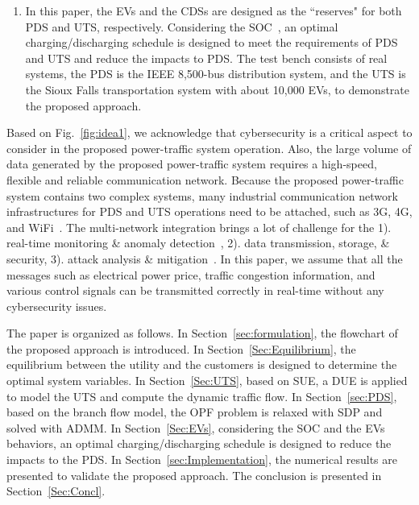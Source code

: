 \documentclass[final]{IEEEtran}
\begin{document}
\begin{enumerate}
	\item In this paper, the EVs and the CDSs are designed as the ``reserves" for both PDS and UTS, respectively. Considering the SOC~\cite{he2013n1ew,pattipati2011sy11stem}, an optimal charging/discharging schedule is designed to meet the requirements of PDS and UTS and reduce the impacts to PDS. The test bench consists of real systems, the PDS is the IEEE 8,500-bus distribution system, and the UTS is the Sioux Falls transportation system with about 10,000 EVs, to demonstrate the proposed approach.
\end{enumerate}

 Based on Fig.~\ref{fig:idea1}, we acknowledge that cybersecurity is a critical aspect to consider in the proposed power-traffic system operation. Also, the large volume of data generated by the proposed power-traffic system requires a high-speed, flexible and reliable communication network. Because the proposed power-traffic system contains two complex systems, many industrial communication network infrastructures for PDS and UTS operations need to be attached, such as 3G, 4G, and WiFi~\cite{sed12jelmaci2017hierarchical}. The multi-network integration brings a lot of challenge for the 1). real-time monitoring \& anomaly detection~\cite{jiang2014fault,jiang2016spatial1}, 2). data transmission, storage, \& security, 3). attack analysis \& mitigation~\cite{ten2010cyber12security, islam2012wirel12ess,geng2015da12ta,jiang2017big}. In this paper, we assume that all the messages such as electrical power price, traffic congestion information, and various control signals can be transmitted correctly in real-time without any cybersecurity issues. 

The paper is organized as follows. In Section~\ref{sec:formulation}, the flowchart of the proposed approach is introduced. In Section~\ref{Sec:Equilibrium}, the equilibrium between the utility and the customers is designed to determine the optimal system variables. In Section~\ref{Sec:UTS}, based on SUE, a DUE is applied to model the UTS and compute the dynamic traffic flow. In Section~\ref{sec:PDS}, based on the branch flow model, the OPF problem is relaxed with SDP and solved with ADMM.  In Section~\ref{Sec:EVs}, considering the SOC and the EVs behaviors, an optimal charging/discharging schedule is designed to reduce the impacts to the PDS. In Section~\ref{sec:Implementation}, the numerical results are presented to validate the proposed approach. The conclusion is presented in Section~\ref{Sec:Concl}.

\end{document}
